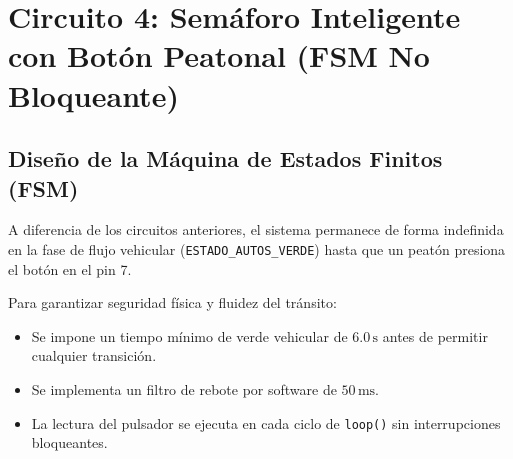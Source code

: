 \documentclass[12pt,a4paper]{article}
\begin{document}
\section{Circuito 4: Semáforo Inteligente con Botón Peatonal (FSM No Bloqueante)}

\subsection{Diseño de la Máquina de Estados Finitos (FSM)}
A diferencia de los circuitos anteriores, el sistema permanece de forma indefinida en la fase de flujo vehicular (\texttt{ESTADO\_AUTOS\_VERDE}) hasta que un peatón presiona el botón en el pin 7. 

Para garantizar seguridad física y fluidez del tránsito:
\begin{itemize}[noitemsep]
    \item Se impone un tiempo mínimo de verde vehicular de $6.0\,\text{s}$ antes de permitir cualquier transición.
    \item Se implementa un filtro de rebote por software de $50\,\text{ms}$.
    \item La lectura del pulsador se ejecuta en cada ciclo de \texttt{loop()} sin interrupciones bloqueantes.
\end{itemize}
\end{document}
